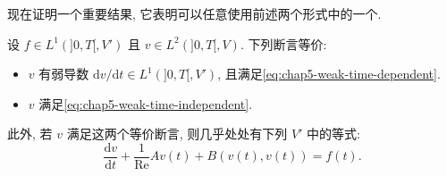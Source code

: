 现在证明一个重要结果, 它表明可以任意使用前述两个形式中的一个.

\begin{Proposition}
\label{prop:chap5-weak-form-equivalence}
设 $f\in L^1(]0,T[,V')$ 且 $v\in L^2(]0,T[,V)$. 下列断言等价:
\begin{itemize}
 \item $v$ 有弱导数 $\mathrm dv/\mathrm dt\in L^1(]0,T[,V')$, 且满足\eqref{eq:chap5-weak-time-dependent}.
 \item $v$ 满足\eqref{eq:chap5-weak-time-independent}.
\end{itemize}

此外, 若 $v$ 满足这两个等价断言, 则几乎处处有下列 $V'$ 中的等式:
\[
 \frac{\mathrm dv}{\mathrm dt}+\frac1{\operatorname{Re}}Av(t)+B(v(t),v(t))=f(t).
\]
\end{Proposition}

